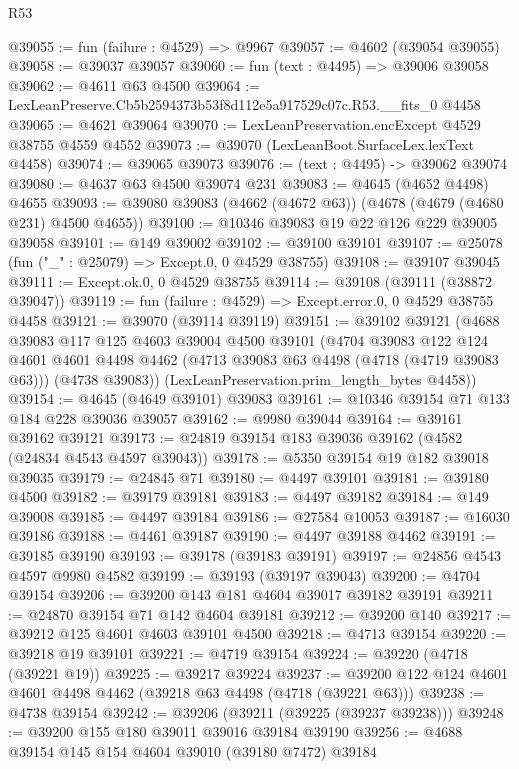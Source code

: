 \begin{lexlean}{R53}
\begin{coremodule}
@39055 := fun (failure : @4529) => @9967
@39057 := @4602 (@39054 @39055)
@39058 := @39037 @39057
@39060 := fun (text : @4495) => @39006 @39058
@39062 := @4611 @63 @4500
@39064 := LexLeanPreserve.Cb5b2594373b53f8d112e5a917529c07c.R53.__fits_0 @4458
@39065 := @4621 @39064
@39070 := LexLeanPreservation.encExcept @4529 @38755 @4559 @4552
@39073 := @39070 (LexLeanBoot.SurfaceLex.lexText @4458)
@39074 := @39065 @39073
@39076 := (text : @4495) -> @39062 @39074
@39080 := @4637 @63 @4500 @39074 @231
@39083 := @4645 (@4652 @4498) @4655
@39093 := @39080 @39083 (@4662 (@4672 @63)) (@4678 (@4679 (@4680 @231) @4500 @4655))
@39100 := @10346 @39083 @19 @22 @126 @229 @39005 @39058
@39101 := @149 @39002
@39102 := @39100 @39101
@39107 := @25078 (fun ("_" : @25079) => Except.{0, 0} @4529 @38755)
@39108 := @39107 @39045
@39111 := Except.ok.{0, 0} @4529 @38755
@39114 := @39108 (@39111 (@38872 @39047))
@39119 := fun (failure : @4529) => Except.error.{0, 0} @4529 @38755 @4458
@39121 := @39070 (@39114 @39119)
@39151 := @39102
    @39121
    (@4688
      @39083
      @117
      @125
      @4603
      @39004
      @4500
      @39101
      (@4704
        @39083
        @122
        @124
        @4601
        @4601
        @4498
        @4462
        (@4713 @39083 @63 @4498 (@4718 (@4719 @39083 @63)))
        (@4738 @39083))
      (LexLeanPreservation.prim_length_bytes @4458))
@39154 := @4645 (@4649 @39101) @39083
@39161 := @10346 @39154 @71 @133 @184 @228 @39036 @39057
@39162 := @9980 @39044
@39164 := @39161 @39162 @39121
@39173 := @24819 @39154 @183 @39036 @39162 (@4582 (@24834 @4543 @4597 @39043))
@39178 := @5350 @39154 @19 @182 @39018 @39035
@39179 := @24845 @71
@39180 := @4497 @39101
@39181 := @39180 @4500
@39182 := @39179 @39181
@39183 := @4497 @39182
@39184 := @149 @39008
@39185 := @4497 @39184
@39186 := @27584 @10053
@39187 := @16030 @39186
@39188 := @4461 @39187
@39190 := @4497 @39188 @4462
@39191 := @39185 @39190
@39193 := @39178 (@39183 @39191)
@39197 := @24856 @4543 @4597 @9980 @4582
@39199 := @39193 (@39197 @39043)
@39200 := @4704 @39154
@39206 := @39200 @143 @181 @4604 @39017 @39182 @39191
@39211 := @24870 @39154 @71 @142 @4604 @39181
@39212 := @39200 @140
@39217 := @39212 @125 @4601 @4603 @39101 @4500
@39218 := @4713 @39154
@39220 := @39218 @19 @39101
@39221 := @4719 @39154
@39224 := @39220 (@4718 (@39221 @19))
@39225 := @39217 @39224
@39237 := @39200 @122 @124 @4601 @4601 @4498 @4462 (@39218 @63 @4498 (@4718 (@39221 @63)))
@39238 := @4738 @39154
@39242 := @39206 (@39211 (@39225 (@39237 @39238)))
@39248 := @39200 @155 @180 @39011 @39016 @39184 @39190
@39256 := @4688 @39154 @145 @154 @4604 @39010 (@39180 @7472) @39184

\end{coremodule}
\end{lexlean}

